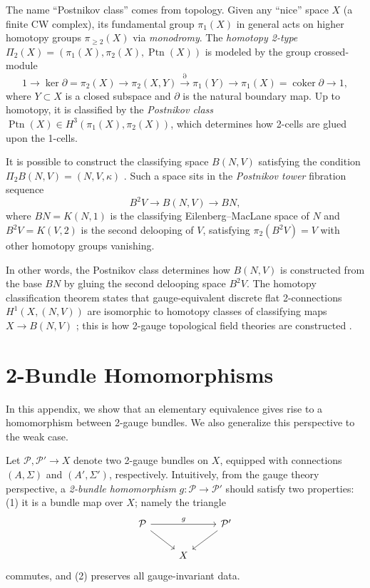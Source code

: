 \documentclass[onecolumn]{article}
\theoremstyle{theorem}
\theoremstyle{remark}
\theoremstyle{example}
\theoremstyle{definition}
\numberwithin{equation}{section}
\begin{document}
The name ``Postnikov class'' comes from topology. Given any ``nice'' space $X$ (a finite CW complex), its fundamental group $\pi_1(X)$ in general acts on higher homotopy groups $\pi_{\geq 2}(X)$ via {\it {monodromy}}. The {\it {homotopy 2-type}} $\Pi_2(X)=(\pi_1(X),\pi_2(X),\operatorname{Ptn}(X))$ is modeled by the group crossed-module \cite{Brown}
\begin{equation}
    1\rightarrow \operatorname{ker}\partial = \pi_2(X) \rightarrow \pi_2(X,Y) \xrightarrow{\partial} \pi_1(Y)\rightarrow \pi_1(X) =\operatorname{coker}\partial\rightarrow 1,\nonumber 
\end{equation}
where $Y\subset X$ is a closed subspace and $\partial$ is the natural boundary map. Up to homotopy, it is classified by the {\it {Postnikov class}} $\operatorname{Ptn}(X)\in H^3(\pi_1(X),\pi_2(X))$, which determines how 2-cells are glued upon the 1-cells.

It is possible to construct the classifying space $B(N,V)$ satisfying the condition $\Pi_2 B(N,V) = (N,V,\kappa)$ \cite{Kapustin:2013uxa,BaezRogers}. Such a space sits in the {\it {Postnikov tower}} fibration sequence
\begin{equation}
    B^2V \rightarrow B(N,V) \rightarrow BN,\nonumber
\end{equation}
where $BN=K(N,1)$ is the classifying Eilenberg--MacLane space of $N$ and $B^2V=K(V,2)$ is the second delooping of $V$, satisfying $\pi_2(B^2V)=V$ with other homotopy groups vanishing. 

In other words, the Postnikov class determines how $B(N,V)$ is constructed from the base $BN$ by gluing the second delooping space $B^2V$. The homotopy classification theorem states that gauge-equivalent discrete flat 2-connections $H^1(X,(N,V))$ are isomorphic to homotopy classes of classifying maps $X\rightarrow B(N,V)$ \cite{Ang2018,BaezRogers}; this is how 2-gauge topological field theories are constructed \cite{Kapustin:2013uxa,Zhu:2019}.



\section{2-Bundle Homomorphisms}\label{weakpost}
In this appendix, we show that an elementary equivalence gives rise to a homomorphism between 2-gauge bundles. We also generalize this perspective to the weak case. 

Let $\mathcal{P},\mathcal{P}'\rightarrow X$ denote two 2-gauge bundles on $X$, equipped with connections $(A,\Sigma)$ and $(A',\Sigma')$, respectively. Intuitively, from the gauge theory perspective, a {\it {2-bundle homomorphism}} $g:\mathcal{P}\rightarrow\mathcal{P}'$ should satisfy two properties: (1) it is a bundle map over $X$; namely the triangle 
\begin{equation}
    \begin{tikzcd}
\mathcal{P} \arrow[rr, "g"] \arrow[rd] &   & \mathcal{P}' \arrow[ld] \\
                                          & X &                        
\end{tikzcd}\nonumber
\end{equation}
commutes, and (2) preserves all gauge-invariant data.
\end{document}
